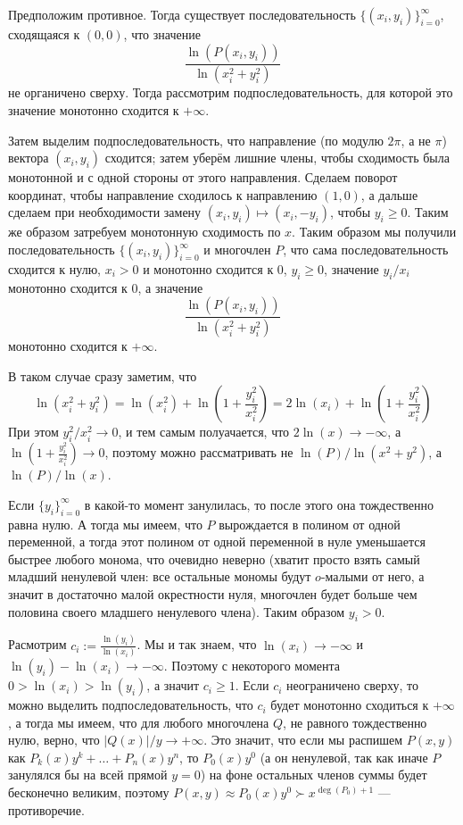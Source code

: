 \documentclass[12pt,a4paper]{article}
\begin{document}
    \begin{problem}{12}
        Предположим противное. Тогда существует последовательность $\{(x_i, y_i)\}_{i=0}^\infty$, сходящаяся к $(0,0)$, что значение
        \[\frac{\ln(P(x_i, y_i))}{\ln(x_i^2+y_i^2)}\]
        не органичено сверху. Тогда рассмотрим подпоследовательность, для которой это значение монотонно сходится к $+\infty$.

        Затем выделим подпоследовательность, что направление (по модулю $2\pi$, а не $\pi$) вектора $(x_i, y_i)$ сходится; затем уберём лишние члены, чтобы сходимость была монотонной и с одной стороны от этого направления. Сделаем поворот координат, чтобы направление сходилось к направлению $(1, 0)$, а дальше сделаем при необходимости замену $(x_i, y_i) \mapsto (x_i, -y_i)$, чтобы $y_i \geqslant 0$. Таким же образом затребуем монотонную сходимость по $x$. Таким образом мы получили последовательность $\{(x_i, y_i)\}_{i=0}^\infty$ и многочлен $P$, что сама последовательность сходится к нулю, $x_i > 0$ и монотонно сходится к $0$, $y_i \geqslant 0$, значение $y_i/x_i$ монотонно сходится к $0$, а значение
        \[\frac{\ln(P(x_i, y_i))}{\ln(x_i^2+y_i^2)}\]
        монотонно сходится к $+\infty$.

        В таком случае сразу заметим, что
        \[\ln(x_i^2+y_i^2) = \ln(x_i^2) + \ln\left(1 + \frac{y_i^2}{x_i^2}\right) = 2\ln(x_i) + \ln\left(1 + \frac{y_i^2}{x_i^2}\right)\]
        При этом $y_i^2/x_i^2 \to 0$, и тем самым полуачается, что $2\ln(x) \to -\infty$, а $\ln\left(1+\frac{y_i^2}{x_i^2}\right) \to 0$, поэтому можно рассматривать не $\ln(P)/\ln(x^2+y^2)$, а $\ln(P)/\ln(x)$.

        Если $\{y_i\}_{i=0}^\infty$ в какой-то момент занулилась, то после этого она тождественно равна нулю. А тогда мы имеем, что $P$ вырождается в полином от одной переменной, а тогда этот полином от одной переменной в нуле уменьшается быстрее любого монома, что очевидно неверно (хватит просто взять самый младший ненулевой член: все остальные мономы будут $o$-малыми от него, а значит в достаточно малой окрестности нуля, многочлен будет больше чем половина своего младшего ненулевого члена). Таким образом $y_i > 0$.

        Расмотрим $c_i := \frac{\ln(y_i)}{\ln(x_i)}$. Мы и так знаем, что $\ln(x_i) \to -\infty$ и $\ln(y_i) - \ln(x_i) \to -\infty$. Поэтому с некоторого момента $0 > \ln(x_i) > \ln(y_i)$, а значит $c_i \geqslant 1$. Если $c_i$ неограничено сверху, то можно выделить подпоследовательность, что $c_i$ будет монотонно сходиться к $+\infty$, а тогда мы имеем, что для любого многочлена $Q$, не равного тождественно нулю, верно, что $|Q(x)|/y \to +\infty$. Это значит, что если мы распишем $P(x, y)$ как $P_k(x)y^k + \dots + P_n(x)y^n$, то $P_0(x)y^0$ (а он ненулевой, так как иначе $P$ занулялся бы на всей прямой $y=0$) на фоне остальных членов суммы будет бесконечно великим, поэтому $P(x, y) \approx P_0(x)y^0 \succ x^{\deg(P_0)+1}$ --- противоречие.


\end{problem}
\end{document}
